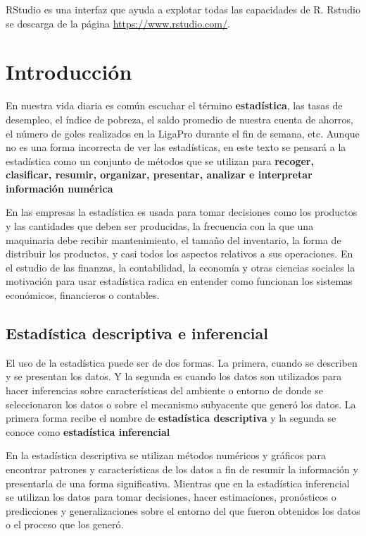 \documentclass[]{book}
\begin{document}
RStudio es una interfaz que ayuda a explotar todas las capacidades de R. Rstudio se descarga de la página \url{https://www.rstudio.com/}.

\hypertarget{intro}{%
\chapter{Introducción}\label{intro}}

En nuestra vida diaria es común escuchar el término \textbf{estadística}, las tasas de desempleo, el índice de pobreza, el saldo promedio de nuestra cuenta de ahorros, el número de goles realizados en la LigaPro durante el fin de semana, etc. Aunque no es una forma incorrecta de ver las estadísticas, en este texto se pensará a la estadística como un conjunto de métodos que se utilizan para \textbf{recoger, clasificar, resumir, organizar, presentar, analizar e interpretar información numérica}

En las empresas la estadística es usada para tomar decisiones como los productos y las cantidades que deben ser producidas, la frecuencia con la que una maquinaria debe recibir mantenimiento, el tamaño del inventario, la forma de distribuir los productos, y casi todos los aspectos relativos a sus operaciones. En el estudio de las finanzas, la contabilidad, la economía y otras ciencias sociales la motivación para usar estadística radica en entender como funcionan los sistemas económicos, financieros o contables.

\hypertarget{estypes}{%
\section{Estadística descriptiva e inferencial}\label{estypes}}

El uso de la estadística puede ser de dos formas. La primera, cuando se describen y se presentan los datos. Y la segunda es cuando los datos son utilizados para hacer inferencias sobre características del ambiente o entorno de donde se seleccionaron los datos o sobre el mecanismo subyacente que generó los datos. La primera forma recibe el nombre de \textbf{estadística descriptiva} y la segunda se conoce como \textbf{estadística inferencial}

En la estadística descriptiva se utilizan métodos numéricos y gráficos para encontrar patrones y características de los datos a fin de resumir la información y presentarla de una forma significativa. Mientras que en la estadística inferencial se utilizan los datos para tomar decisiones, hacer estimaciones, pronósticos o predicciones y generalizaciones sobre el entorno del que fueron obtenidos los datos o el proceso que los generó.
\end{document}
